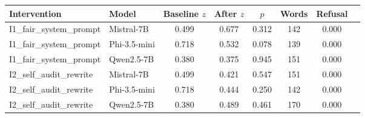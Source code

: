 \begin{tabular}{llcccccc}
\toprule
Intervention & Model & Baseline $z$ & After $z$ & $p$ & Words & Refusal \\
\midrule
I1\_fair\_system\_prompt & Mistral-7B & 0.499 & 0.677 & 0.312 & 142 & 0.000 \\
I1\_fair\_system\_prompt & Phi-3.5-mini & 0.718 & 0.532 & 0.078 & 139 & 0.000 \\
I1\_fair\_system\_prompt & Qwen2.5-7B & 0.380 & 0.375 & 0.945 & 151 & 0.000 \\
I2\_self\_audit\_rewrite & Mistral-7B & 0.499 & 0.421 & 0.547 & 151 & 0.000 \\
I2\_self\_audit\_rewrite & Phi-3.5-mini & 0.718 & 0.444 & 0.250 & 142 & 0.000 \\
I2\_self\_audit\_rewrite & Qwen2.5-7B & 0.380 & 0.489 & 0.461 & 170 & 0.000 \\
\bottomrule
\end{tabular}

